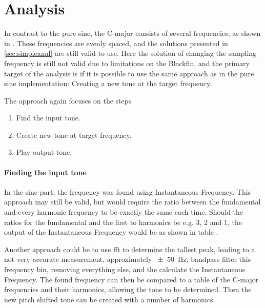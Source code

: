 
\section{Analysis}
In contrast to the pure sine, the C-major consists of several frequencies, as shown in .
These frequencies are evenly spaced, and the solutions presented in \cref{sec:simpleanal} are still valid to use.
Here the solution of changing the sampling frequency is still not valid due to limitations on the Blackfin, and the primary target of the analysis is if it is possible to use the same approach as in the pure sine implementation: Creating a new tone at the target frequency.

The approach again focuses on the steps
\begin{enumerate}
	\item Find the input tone.
	\item Create new tone at target frequency.
	\item Play output tone.
\end{enumerate}

\paragraph{Finding the input tone}
In the sine part, the frequency was found using Instantaneous Frequency.
This approach may still be valid, but would require the ratio between the fundamental and every harmonic frequency to be exactly the same each time.
Should the ratios for the fundamental and the first to harmonics be e.g. 3, 2 and 1, the output of the Instantaneous Frequency would be as shown in table .

Another approach could be to use fft to determine the tallest peak, leading to a not very accurate measurement, approximately \SI{\pm50}{\hertz}, bandpass filter this frequency bin, removing everything else, and the calculate the Instantaneous Frequency.
The found frequency can then be compared to a table of the C-major frequencies and their harmonics, allowing the tone to be determined.
Then the new pitch shifted tone can be created with a number of harmonics.